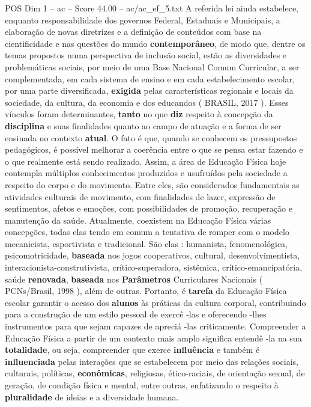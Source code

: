 \begin{textsample}{POS Dim 1 – ac – Score 44.00 – ac/ac\_ef\_5.txt}
A referida lei ainda estabelece, enquanto responsabilidade dos governos Federal, Estaduais e Municipais, a elaboração de novas diretrizes e a definição de conteúdos com base na cientificidade e nas questões do mundo \textbf{contemporâneo}, de modo que, dentre os temas propostos numa perspectiva de inclusão social, estão as diversidades e problemáticas sociais, por meio de uma Base Nacional Comum Curricular, a ser complementada, em cada sistema de ensino e em cada estabelecimento escolar, por uma parte diversificada, \textbf{exigida} pelas características regionais e locais da sociedade, da cultura, da economia e dos educandos ( BRASIL, 2017 ).
Esses vínculos foram determinantes, \textbf{tanto} no que \textbf{diz} respeito à concepção da \textbf{disciplina} e suas finalidades quanto ao campo de atuação e a forma de ser ensinada no contexto \textbf{atual}.
O fato é que, quando se conhecem os pressupostos pedagógicos, é possível melhorar a coerência entre o que se pensa estar fazendo e o que realmente está sendo realizado.
Assim, a área de Educação Física hoje contempla múltiplos conhecimentos produzidos e usufruídos pela sociedade a respeito do corpo e do movimento.
Entre eles, são considerados fundamentais as atividades culturais de movimento, com finalidades de lazer, expressão de sentimentos, afetos e emoções, com possibilidades de promoção, recuperação e manutenção da saúde.
Atualmente, coexistem na Educação Física várias concepções, todas elas tendo em comum a tentativa de romper com o modelo mecanicista, esportivista e tradicional.
São elas : humanista, fenomenológica, psicomotricidade, \textbf{baseada} nos jogos cooperativos, cultural, desenvolvimentista, interacionista-construtivista, crítico-superadora, sistêmica, crítico-emancipatória, saúde \textbf{renovada}, \textbf{baseada} nos \textbf{Parâmetros} Curriculares Nacionais ( PCNs/Brasil, 1998 ), além de outras.
Portanto, é \textbf{tarefa} da Educação Física escolar garantir o acesso dos \textbf{alunos} às práticas da cultura corporal, contribuindo para a construção de um estilo pessoal de exercê -las e oferecendo -lhes instrumentos para que sejam capazes de apreciá -las criticamente.
Compreender a Educação Física a partir de um contexto mais amplo significa entendê -la na sua \textbf{totalidade}, ou seja, compreender que exerce \textbf{influência} e também é \textbf{influenciada} pelas interações que se estabelecem por meio das relações sociais, culturais, políticas, \textbf{econômicas}, religiosas, ético-raciais, de orientação sexual, de geração, de condição física e mental, entre outras, enfatizando o respeito à \textbf{pluralidade} de ideias e a diversidade humana.

\end{textsample}
